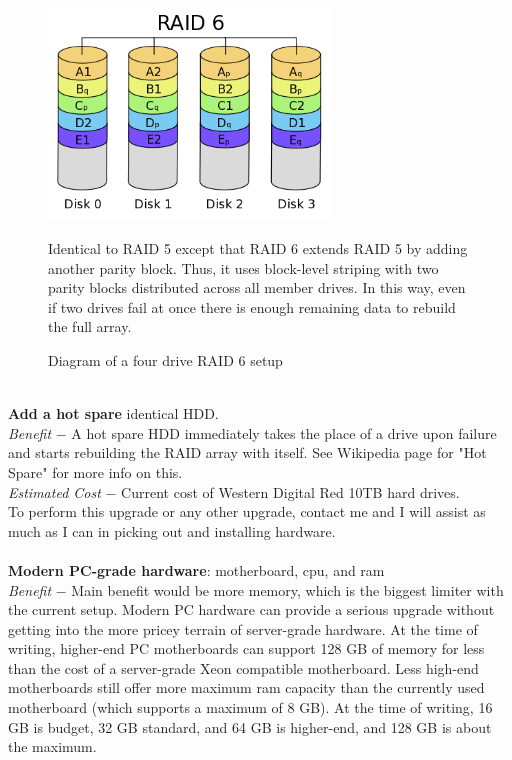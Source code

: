 \documentclass[titlepage]{article}
\begin{document}
    \begin{figure}[t]
    \centering
    \includegraphics[width=75mm]{RAID6.png}
     \caption{Diagram of a four drive RAID 6 setup}
     \medskip 
     \small 
     Identical to RAID 5 except that RAID 6 extends RAID 5 by adding another parity block. Thus, it uses block-level striping with two parity blocks distributed across all member drives. In this way, even if two drives fail at once there is enough remaining data to rebuild the full array.
     \label{RAID6}
    \end{figure}
    
    \noindent\makebox[\linewidth]{\rule{\textwidth}{0.4pt}}
    \\
    
    \noindent\textbf{Add a hot spare} identical HDD.
    \\
    
    \noindent\textit{Benefit} $-$  A hot spare HDD immediately takes the place of a drive upon failure and starts rebuilding the RAID array with itself. See Wikipedia page for "Hot Spare" for more info on this.
    \\
    
    \noindent\textit{Estimated Cost} $-$ Current cost of Western Digital Red 10TB hard drives. 
    \\
    
    \noindent To perform this upgrade or any other upgrade, contact me and I will assist as much as I can in picking out and installing hardware.
    \\
    
    \noindent\makebox[\linewidth]{\rule{\textwidth}{0.4pt}}
    \\
    
    \noindent\textbf{Modern PC-grade hardware}: motherboard, cpu, and ram
    \\
    
    \noindent\textit{Benefit} $-$ Main benefit would be more memory, which is the biggest limiter with the current setup. Modern PC hardware can provide a serious upgrade without getting into the more pricey terrain of server-grade hardware. At the time of writing, higher-end PC motherboards can support 128 GB of memory for less than the cost of a server-grade Xeon compatible motherboard. Less high-end motherboards still offer more maximum ram capacity than the currently used motherboard (which supports a maximum of 8 GB). At the time of writing, 16 GB is budget, 32 GB standard, and 64 GB is higher-end, and 128 GB is about the maximum.
    \\
    
\end{document}
